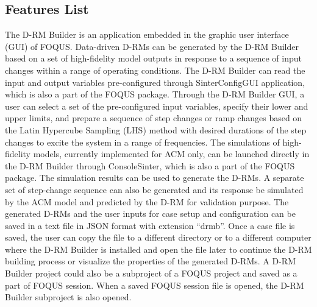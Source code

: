 \subsection{Features List}

The D-RM Builder is an application embedded in the graphic user interface (GUI) of FOQUS.  Data-driven D-RMs can be generated by the D-RM Builder based on a set of high-fidelity model outputs in response to a sequence of input changes within a range of operating conditions.  The D-RM Builder can read the input and output variables pre-configured through SinterConfigGUI application, which is also a part of the FOQUS package.  Through the D-RM Builder GUI, a user can select a set of the pre-configured input variables, specify their lower and upper limits, and prepare a sequence of step changes or ramp changes based on the Latin Hypercube Sampling (LHS) method with desired durations of the step changes to excite the system in a range of frequencies.  The simulations of high-fidelity models, currently implemented for ACM only, can be launched directly in the D-RM Builder through ConsoleSinter, which is also a part of the FOQUS package.  The simulation results can be used to generate the D-RMs.  A separate set of step-change sequence can also be generated and its response be simulated by the ACM model and predicted by the D-RM for validation purpose.  The generated D-RMs and the user inputs for case setup and configuration can be saved in a text file in JSON format with extension ``drmb''.  Once a case file is saved, the user can copy the file to a different directory or to a different computer where the D-RM Builder is installed and open the file later to continue the D-RM building process or visualize the properties of the generated D-RMs.  A D-RM Builder project could also be a subproject of a FOQUS project and saved as a part of FOQUS session.  When a saved FOQUS session file is opened, the D-RM Builder subproject is also opened.


